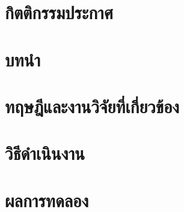 \documentclass{cpereport}
\begin{document}
\chapter*{กิตติกรรมประกาศ}



\tableofcontents

\chapter{บทนำ}



\chapter{ทฤษฎีและงานวิจัยที่เกี่ยวข้อง}



\chapter{วิธีดำเนินงาน}



\chapter{ผลการทดลอง}



 

\end{document}
